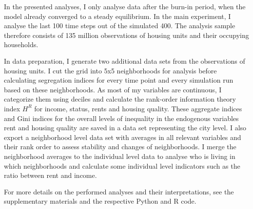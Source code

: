 \documentclass[a4paper,12pt]{article}
\begin{document}
In the presented analyses, I only analyse data after the burn-in period, when the model already converged to a steady equilibrium. In the main experiment, I analyse the last 100 time steps out of the simulated 400. The analysis sample therefore consists of 135 million observations of housing units and their occupying households.

In data preparation, I generate two additional data sets from the observations of housing units. I cut the grid into 5x5 neighborhoods for analysis before calculating segregation indices for every time point and every simulation run based on these neighborhoods. As most of my variables are continuous, I categorize them using deciles and calculate the rank-order information theory index $H^R$ \citep{reardonNewApproachMeasuring2006} for income, status, rents and housing quality. These aggregate indices and Gini indices for the overall levels of inequality in the endogenous variables rent and housing quality are saved in a data set representing the city level. I also export a neighborhood level data set with averages in all relevant variables and their rank order to assess stability and changes of neighborhoods. I merge the neighborhood averages to the individual level data to analyse who is living in which neighborhoods and calculate some individual level indicators such as the ratio between rent and income.

For more details on the performed analyses and their interpretations, see the supplementary materials and the respective Python and R code.

\end{document}
